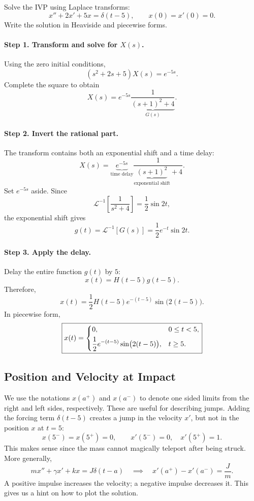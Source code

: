 \documentclass[10pt,letterpaper]{article}
\begin{document}
\begin{example}[2]{
Solve the IVP using Laplace transforms:
\[
x''+2x'+5x=\delta(t-5),
\qquad x(0)=x'(0)=0.
\]
Write the solution in Heaviside and piecewise forms.
}

\paragraph{Step 1. Transform and solve for $X(s)$.}
Using the zero initial conditions,
\[
(s^2+2s+5)X(s)=e^{-5s}.
\]
Complete the square to obtain
\[
X(s)=e^{-5s}
\underbrace{\frac{1}{(s+1)^2+4}}_{G(s)}.
\]

\paragraph{Step 2. Invert the rational part.}
The transform contains both an exponential shift
and a time delay:
\[
X(s)=
\underbrace{e^{-5s}}_{\text{time delay}}
\frac{1}{\underbrace{(s+1)^2}_{\text{exponential shift}}+4}.
\]
Set $e^{-5s}$ aside. Since
\[
\mathcal L^{-1}\left[\frac{1}{s^2+4}\right]
=\frac12\sin2t,
\]
the exponential shift gives
\[
g(t)=\mathcal L^{-1}[G(s)]
=\frac12e^{-t}\sin2t.
\]

\paragraph{Step 3. Apply the delay.}
Delay the entire function $g(t)$ by $5$:
\[
x(t)=H(t-5)g(t-5).
\]
Therefore,
\[
\boxed{
x(t)=\frac12H(t-5)e^{-(t-5)}
\sin\bigl(2(t-5)\bigr).
}
\]
In piecewise form,
\[
\boxed{
x(t)=
\begin{dcases}
0, & 0\le t<5,\\
\frac12e^{-(t-5)}\sin\bigl(2(t-5)\bigr),
& t\ge5.
\end{dcases}
}
\]
\end{example}

\subsection{Position and Velocity at Impact}

We use the notations $x(a^+)$ and $x(a^-)$ to denote one sided limits from the right and left sides, respectively. These are useful for describing jumps. Adding the forcing term $\delta(t-5)$ creates a jump in the velocity $x'$, but not in the position $x$ at $t=5$:
\[
x(5^-)=x(5^+)=0,
\qquad
x'(5^-)=0,\quad x'(5^+)=1.
\]
This makes sense since the mass cannot magically teleport after being struck. More generally,
\[
mx''+\gamma x'+kx=J\delta(t-a)
\quad\implies\quad
x'(a^+)-x'(a^-)=\frac{J}{m}.
\]
A positive impulse increases the velocity; a negative impulse decreases it. This gives us a hint on how to plot the solution.
\end{document}
